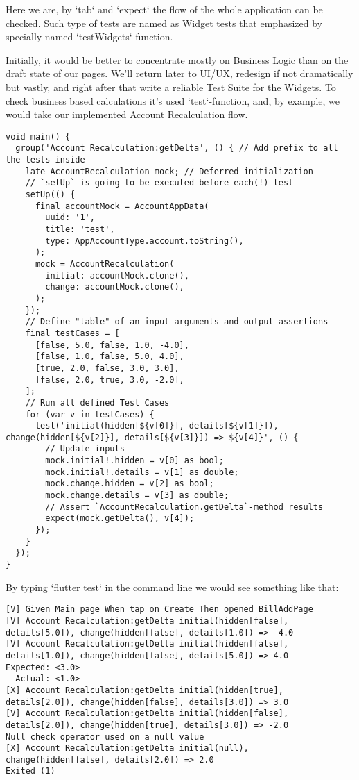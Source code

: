 Here we are, by `tab` and `expect` the flow of the whole application can be checked. Such type of tests are named as 
Widget tests that emphasized by specially named `testWidgets`-function.

Initially, it would be better to concentrate mostly on Business Logic than on the draft state of our pages. We'll 
return later to UI/UX, redesign if not dramatically but vastly, and right after that write a reliable 
Test Suite for the Widgets. To check business based calculations it's used `test`-function, and, by example, we would
take our implemented Account Recalculation flow.

\begin{lstlisting}
void main() {
  group('Account Recalculation:getDelta', () { // Add prefix to all the tests inside
    late AccountRecalculation mock; // Deferred initialization 
    // `setUp`-is going to be executed before each(!) test
    setUp(() {
      final accountMock = AccountAppData(
        uuid: '1',
        title: 'test',
        type: AppAccountType.account.toString(),
      );
      mock = AccountRecalculation(
        initial: accountMock.clone(),
        change: accountMock.clone(),
      );
    });
    // Define "table" of an input arguments and output assertions
    final testCases = [
      [false, 5.0, false, 1.0, -4.0],
      [false, 1.0, false, 5.0, 4.0],
      [true, 2.0, false, 3.0, 3.0],
      [false, 2.0, true, 3.0, -2.0],
    ];
    // Run all defined Test Cases
    for (var v in testCases) {
      test('initial(hidden[${v[0]}], details[${v[1]}]), change(hidden[${v[2]}], details[${v[3]}]) => ${v[4]}', () {
        // Update inputs
        mock.initial!.hidden = v[0] as bool;
        mock.initial!.details = v[1] as double;
        mock.change.hidden = v[2] as bool;
        mock.change.details = v[3] as double;
        // Assert `AccountRecalculation.getDelta`-method results
        expect(mock.getDelta(), v[4]); 
      });
    }
  });
}
\end{lstlisting}

By typing `flutter test` in the command line we would see something like that:

\begin{lstlisting}
[V] Given Main page When tap on Create Then opened BillAddPage
[V] Account Recalculation:getDelta initial(hidden[false], details[5.0]), change(hidden[false], details[1.0]) => -4.0
[V] Account Recalculation:getDelta initial(hidden[false], details[1.0]), change(hidden[false], details[5.0]) => 4.0
Expected: <3.0>
  Actual: <1.0>
[X] Account Recalculation:getDelta initial(hidden[true], details[2.0]), change(hidden[false], details[3.0]) => 3.0
[V] Account Recalculation:getDelta initial(hidden[false], details[2.0]), change(hidden[true], details[3.0]) => -2.0
Null check operator used on a null value
[X] Account Recalculation:getDelta initial(null), change(hidden[false], details[2.0]) => 2.0
Exited (1)
\end{lstlisting}

